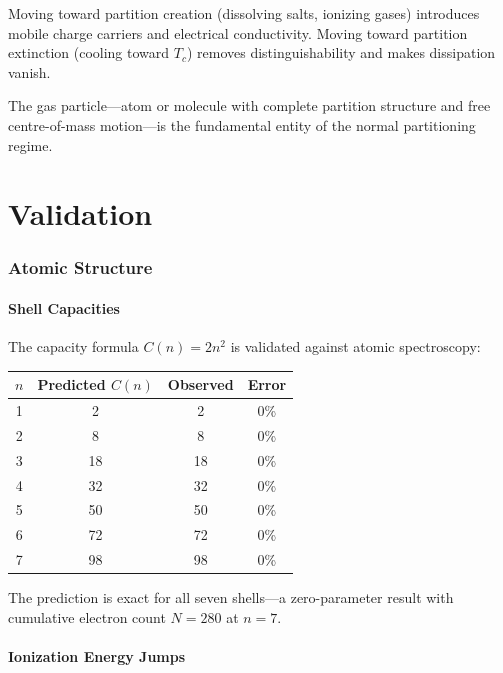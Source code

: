 \documentclass[twocolumn,10pt,a4paper]{article}
\theoremstyle{plain}
\theoremstyle{definition}
\theoremstyle{remark}
\begin{document}
Moving toward partition creation (dissolving salts, ionizing gases) introduces mobile charge carriers and electrical conductivity. Moving toward partition extinction (cooling toward $T_c$) removes distinguishability and makes dissipation vanish.

The gas particle---atom or molecule with complete partition structure and free centre-of-mass motion---is the fundamental entity of the normal partitioning regime.


\part{Validation}
\label{part:validation}

\section{Atomic Structure}
\label{sec:val_atomic}

\subsection{Shell Capacities}

The capacity formula $C(n) = 2n^2$ is validated against atomic spectroscopy:

\begin{center}
\begin{tabular}{cccc}
\toprule
$n$ & Predicted $C(n)$ & Observed & Error \\
\midrule
1 & 2 & 2 & 0\% \\
2 & 8 & 8 & 0\% \\
3 & 18 & 18 & 0\% \\
4 & 32 & 32 & 0\% \\
5 & 50 & 50 & 0\% \\
6 & 72 & 72 & 0\% \\
7 & 98 & 98 & 0\% \\
\bottomrule
\end{tabular}
\end{center}

The prediction is exact for all seven shells---a zero-parameter result with cumulative electron count $N = 280$ at $n = 7$.

\subsection{Ionization Energy Jumps}
\end{document}
